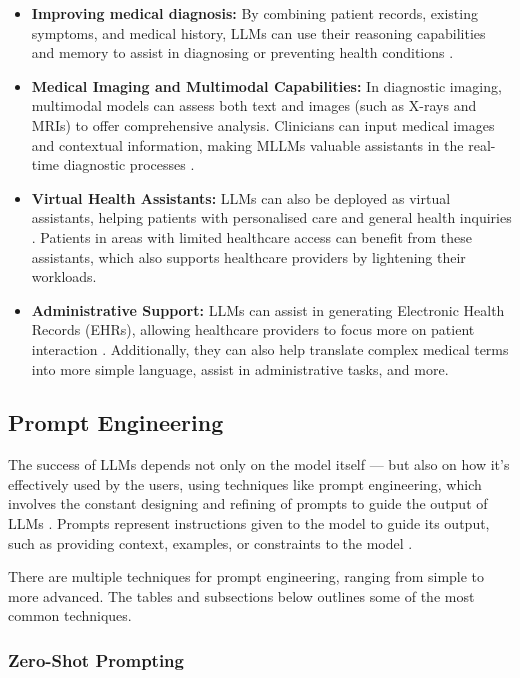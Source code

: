\begin{itemize}
    \item \textbf{Improving medical diagnosis:} By combining patient records, existing symptoms, and medical history, LLMs can use their reasoning capabilities and memory to assist in diagnosing or preventing health conditions \parencite{llm_healthcare,llm_healthcare3,llm_healthcare4}.
    \item \textbf{Medical Imaging and Multimodal Capabilities:} In diagnostic imaging, multimodal models can assess both text and images (such as X-rays and MRIs) to offer comprehensive analysis. Clinicians can input medical images and contextual information, making MLLMs valuable assistants in the real-time diagnostic processes \parencite{llm_healthcare3}.
    \item \textbf{Virtual Health Assistants:} LLMs can also be deployed as virtual assistants, helping patients with personalised care and general health inquiries \parencite{llm_healthcare,llm_healthcare3}. Patients in areas with limited healthcare access can benefit from these assistants, which also supports healthcare providers by lightening their workloads.
    \item \textbf{Administrative Support:} LLMs can assist in generating Electronic Health Records (EHRs), allowing healthcare providers to focus more on patient interaction \parencite{llm_healthcare4}. Additionally, they can also help translate complex medical terms into more simple language, assist in administrative tasks, and more.
\end{itemize}

\subsection{Prompt Engineering}

The success of LLMs depends not only on the model itself --- but also on how it's effectively used by the users, using techniques like prompt engineering, which involves the constant designing and refining of prompts to guide the output of LLMs \parencite{promptmed,prompt2}. Prompts represent instructions given to the model to guide its output, such as providing context, examples, or constraints to the model \parencite{prompt,prompt1,prompt2}. 

There are multiple techniques for prompt engineering, ranging from simple to more advanced. The tables and subsections below outlines some of the most common techniques.

\subsubsection{Zero-Shot Prompting}

